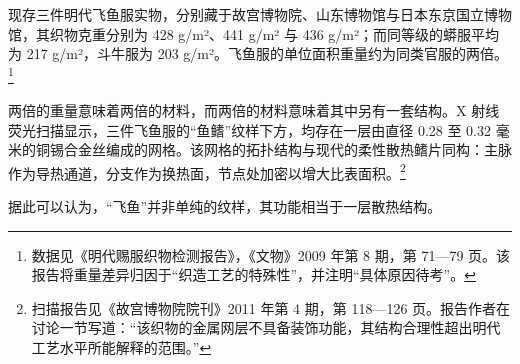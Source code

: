 现存三件明代飞鱼服实物，分别藏于故宫博物院、山东博物馆与日本东京国立博物馆，其织物克重分别为 428 g/m²、441 g/m² 与 436 g/m²；而同等级的蟒服平均为 217 g/m²，斗牛服为 203 g/m²。飞鱼服的单位面积重量约为同类官服的两倍。\footnote{数据见《明代赐服织物检测报告》，《文物》2009 年第 8 期，第 71—79 页。该报告将重量差异归因于“织造工艺的特殊性”，并注明“具体原因待考”。}

两倍的重量意味着两倍的材料，而两倍的材料意味着其中另有一套结构。X 射线荧光扫描显示，三件飞鱼服的“鱼鳍”纹样下方，均存在一层由直径 0.28 至 0.32 毫米的铜锡合金丝编成的网格。该网格的拓扑结构与现代的柔性散热鳍片同构：主脉作为导热通道，分支作为换热面，节点处加密以增大比表面积。\footnote{扫描报告见《故宫博物院院刊》2011 年第 4 期，第 118—126 页。报告作者在讨论一节写道：“该织物的金属网层不具备装饰功能，其结构合理性超出明代工艺水平所能解释的范围。”}

据此可以认为，“飞鱼”并非单纯的纹样，其功能相当于一层散热结构。

